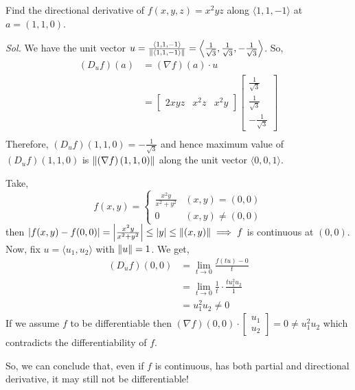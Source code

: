 \documentclass[../Analysis-3]{subfiles}
\begin{document}
\begin{Eg}{}{}
  Find the directional derivative of $ f(x,y,z) = x^2yz $ along $ \langle 1,1,-1 \rangle $ at $ a = (1,1,0) $.

  \textit{Sol.} We have the unit vector $ u = \frac{\langle 1,1,-1 \rangle}{\norm{\langle 1,1,-1 \rangle}} = \left\langle \frac{1}{\sqrt{3}}, \frac{1}{\sqrt{3}}, -\frac{1}{\sqrt{3}} \right\rangle $. So,
  \begin{align*}
    \left( D_uf \right)\left( a \right) & = \left( \nabla f\right)\left( a \right)\cdot u                                                   \\
                                        & = \begin{bmatrix} 2xyz & x^2z & x^2y \end{bmatrix}
    \begin{bmatrix} \frac{1}{\sqrt{3}} \\ \frac{1}{\sqrt{3}} \\ -\frac{1}{\sqrt{3}} \end{bmatrix} \\
  \end{align*}
  Therefore, $ \left( D_uf \right)(1,1,0) = -\frac{1}{\sqrt{3}} $ and hence maximum value of $ \left( D_uf \right)(1,1,0) $ is $ \norm{\left( \nabla f\right)(1,1,0)} $ along the unit vector $ \langle 0,0,1 \rangle $.
\end{Eg}

\begin{Eg}{}{}
  Take,
  \[ f(x,y) = \begin{cases}
      \frac{x^2y}{x^2+y^2} & (x,y) = (0,0)     \\
      0                    & (x,y) \not= (0,0)
    \end{cases} \]
  then $ \left| f(x,y) - f(0,0) \right| = \left| \frac{x^2y}{x^2+y^2} \right| \leq |y| \leq \norm{(x,y)} \implies f $ is continuous at $ (0,0) $. Now, fix $ u = \langle u_1, u_2 \rangle $ with $ \norm{u} = 1 $. We get,
  \begin{align*}
    \left( D_uf \right)(0,0) & = \lim_{t\to 0} \frac{f(tu)- 0}{t}                        \\
                             & =\lim_{t\to 0} \frac{1}{t}\cdot\frac{tu_1^2u_2}{1}        \\
                             & = u_1^2u_2 \not= 0 \tag{Because, $ u $ is an unit vector}
  \end{align*}
  If we assume $ f $ to be differentiable then $ \left( \nabla f \right)(0,0) \cdot \begin{bmatrix} u_1 \\ u_2  \end{bmatrix} = 0 \not= u_1^2u_2 $ which contradicts the differentiability of $ f $.
\end{Eg}

So, we can conclude that, even if $ f $ is continuous, has both partial and directional derivative, it may still not be differentiable!
\end{document}
